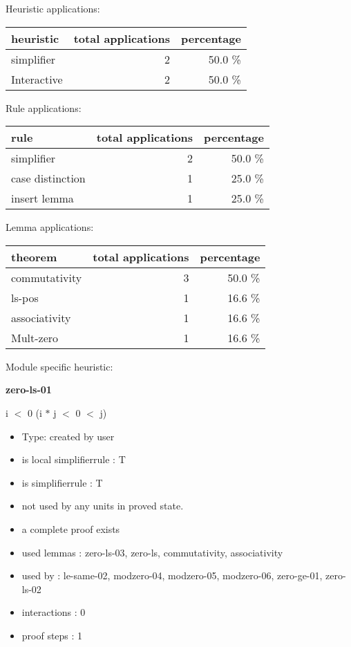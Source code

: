 \documentclass[a4paper]{article}
\begin{document}
\medskip


Heuristic applications:

\begin{supertabular}{l|r|r}
heuristic	& total applications & percentage \\ \hline
simplifier & 2 & 50.0 \% \\
Interactive & 2 & 50.0 \% \\

\end{supertabular}

Rule applications:

\begin{supertabular}{l|r|r}
rule	        & total applications & percentage \\ \hline
simplifier & 2 & 50.0 \% \\
case distinction & 1 & 25.0 \% \\
insert lemma & 1 & 25.0 \% \\

\end{supertabular}

Lemma applications:

\begin{supertabular}{l|r|r}
theorem	        & total applications & percentage \\ \hline
commutativity & 3 & 50.0 \% \\
ls-pos & 1 & 16.6 \% \\
associativity & 1 & 16.6 \% \\
Mult-zero & 1 & 16.6 \% \\

\end{supertabular}

Module specific heuristic:

\pagebreak

{\LARGE\bf zero-ls-01}\label{lemma-zero-ls-01}

\medskip

 \Fol i $<$ 0 \Imp (i $*$ j $<$ 0  $<$ j)

\begin{itemize}

\item Type: created by user

\item is local simplifierrule : T
\item is simplifierrule : T
\item not used by any units in proved state.
\item       a complete proof exists
\item       used lemmas  : zero-ls-03, zero-ls, commutativity, associativity
\item       used by      : le-same-02, modzero-04, modzero-05, modzero-06, zero-ge-01, zero-ls-02
\item       interactions : 0
\item       proof steps  : 1
\end{itemize}
\end{document}
